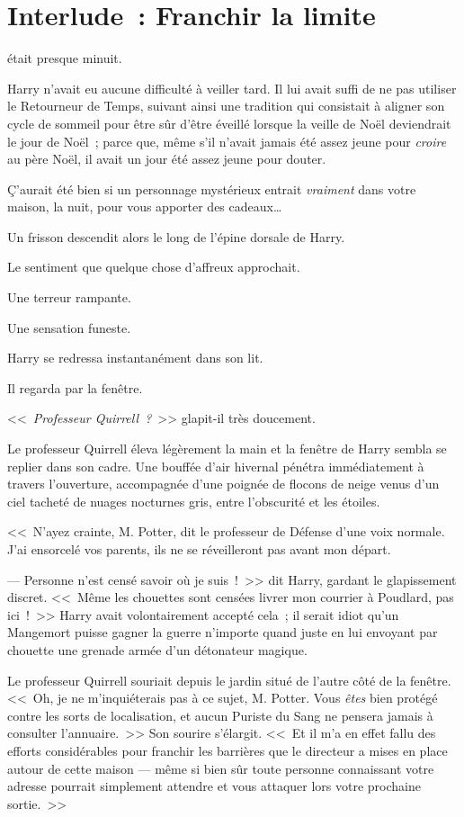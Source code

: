 \chapter{Interlude~: Franchir la limite}

 était presque minuit.

\hplettrineextrapara
Harry n'avait eu aucune difficulté à veiller tard. Il lui avait suffi de ne pas utiliser le Retourneur de Temps, suivant ainsi une tradition qui consistait à aligner son cycle de sommeil pour être sûr d'être éveillé lorsque la veille de Noël deviendrait le jour de Noël~; parce que, même s'il n'avait jamais été assez jeune pour \emph{croire} au père Noël, il avait un jour été assez jeune pour douter.

Ç'aurait été bien si un personnage mystérieux entrait \emph{vraiment} dans votre maison, la nuit, pour vous apporter des cadeaux…

Un frisson descendit alors le long de l'épine dorsale de Harry.

Le sentiment que quelque chose d'affreux approchait.

Une terreur rampante.

Une sensation funeste.

Harry se redressa instantanément dans son lit.

Il regarda par la fenêtre.

<<~\emph{Professeur Quirrell~?}~>> glapit-il très doucement.

Le professeur Quirrell éleva légèrement la main et la fenêtre de Harry sembla se replier dans son cadre. Une bouffée d'air hivernal pénétra immédiatement à travers l'ouverture, accompagnée d'une poignée de flocons de neige venus d'un ciel tacheté de nuages nocturnes gris, entre l'obscurité et les étoiles.

<<~N'ayez crainte, M. Potter, dit le professeur de Défense d'une voix normale. J'ai ensorcelé vos parents, ils ne se réveilleront pas avant mon départ.

--- Personne n'est censé savoir où je suis~!~>> dit Harry, gardant le glapissement discret. <<~Même les chouettes sont censées livrer mon courrier à Poudlard, pas ici~!~>> Harry avait volontairement accepté cela~; il serait idiot qu'un Mangemort puisse gagner la guerre n'importe quand juste en lui envoyant par chouette une grenade armée d'un détonateur magique.

Le professeur Quirrell souriait depuis le jardin situé de l'autre côté de la fenêtre. <<~Oh, je ne m'inquiéterais pas à ce sujet, M. Potter. Vous \emph{êtes} bien protégé contre les sorts de localisation, et aucun Puriste du Sang ne pensera jamais à consulter l'annuaire.~>> Son sourire s'élargit. <<~Et il m'a en effet fallu des efforts considérables pour franchir les barrières que le directeur a mises en place autour de cette maison — même si bien sûr toute personne connaissant votre adresse pourrait simplement attendre et vous attaquer lors votre prochaine sortie.~>>

